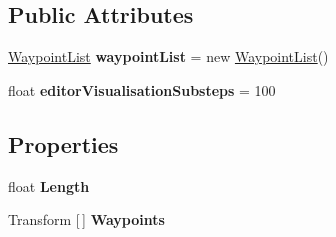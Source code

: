 \subsection*{Public Attributes}
\begin{DoxyCompactItemize}
\item 
\mbox{\label{class_unity_standard_assets_1_1_utility_1_1_waypoint_circuit_a7cef14c77ae5197606ba1aade971ed3d}} 
\hyperlink{class_unity_standard_assets_1_1_utility_1_1_waypoint_circuit_1_1_waypoint_list}{Waypoint\+List} {\bfseries waypoint\+List} = new \hyperlink{class_unity_standard_assets_1_1_utility_1_1_waypoint_circuit_1_1_waypoint_list}{Waypoint\+List}()
\item 
\mbox{\label{class_unity_standard_assets_1_1_utility_1_1_waypoint_circuit_a8d79a68fb7501d467e45990cd38c0de0}} 
float {\bfseries editor\+Visualisation\+Substeps} = 100
\end{DoxyCompactItemize}
\subsection*{Properties}
\begin{DoxyCompactItemize}
\item 
\mbox{\label{class_unity_standard_assets_1_1_utility_1_1_waypoint_circuit_a0cb31df6885aa3bd8924ece61343c529}} 
float {\bfseries Length}
\item 
\mbox{\label{class_unity_standard_assets_1_1_utility_1_1_waypoint_circuit_abdceee908c241b0568f6b7545c0f677a}} 
Transform \mbox{[}$\,$\mbox{]} {\bfseries Waypoints}
\end{DoxyCompactItemize}

